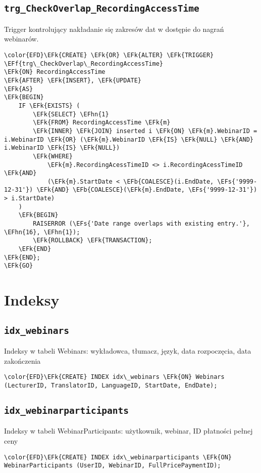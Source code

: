 \documentclass[11pt]{article}
\newcommand{\EFs}[1]{\textcolor{EFs}{#1}} %
\newcommand{\EFk}[1]{\textcolor{EFk}{\textbf{#1}}} %
\newcommand{\EFb}[1]{\textcolor{EFb}{\textbf{#1}}} %
\newcommand{\EFf}[1]{\textcolor{EFf}{#1}} %
\newcommand{\EFhn}[1]{\textcolor{EFhn}{#1}} %
\begin{document}
\subsection{\texttt{trg\_CheckOverlap\_RecordingAccessTime}}
\label{sec:org70a054b}
Trigger kontrolujący nakładanie się zakresów dat w dostępie do nagrań webinarów.
\begin{Code}
\begin{Verbatim}
\color{EFD}\EFk{CREATE} \EFk{OR} \EFk{ALTER} \EFk{TRIGGER} \EFf{trg\_CheckOverlap\_RecordingAccessTime}
\EFk{ON} RecordingAccessTime
\EFk{AFTER} \EFk{INSERT}, \EFk{UPDATE}
\EFk{AS}
\EFk{BEGIN}
    IF \EFk{EXISTS} (
        \EFk{SELECT} \EFhn{1} 
        \EFk{FROM} RecordingAccessTime \EFk{m}
        \EFk{INNER} \EFk{JOIN} inserted i \EFk{ON} \EFk{m}.WebinarID = i.WebinarID \EFk{OR} (\EFk{m}.WebinarID \EFk{IS} \EFk{NULL} \EFk{AND} i.WebinarID \EFk{IS} \EFk{NULL})
        \EFk{WHERE} 
            \EFk{m}.RecordingAcessTimeID <> i.RecordingAcessTimeID \EFk{AND}
            (\EFk{m}.StartDate < \EFb{COALESCE}(i.EndDate, \EFs{'9999-12-31'}) \EFk{AND} \EFb{COALESCE}(\EFk{m}.EndDate, \EFs{'9999-12-31'}) > i.StartDate)
    )
    \EFk{BEGIN}
        RAISERROR (\EFs{'Date range overlaps with existing entry.'}, \EFhn{16}, \EFhn{1});
        \EFk{ROLLBACK} \EFk{TRANSACTION};
    \EFk{END}
\EFk{END};
\EFk{GO}
\end{Verbatim}
\end{Code}
\section{Indeksy}
\label{sec:org4fc2bf6}
\subsection{\texttt{idx\_webinars}}
\label{sec:org6125f2c}
Indeksy w tabeli Webinars: wykładowca, tłumacz, język, data rozpoczęcia, data zakończenia
\begin{Code}
\begin{Verbatim}
\color{EFD}\EFk{CREATE} INDEX idx\_webinars \EFk{ON} Webinars (LecturerID, TranslatorID, LanguageID, StartDate, EndDate);
\end{Verbatim}
\end{Code}
\subsection{\texttt{idx\_webinarparticipants}}
\label{sec:orgd820a04}
Indeksy w tabeli WebinarParticipants: użytkownik, webinar, ID płatności pełnej ceny
\begin{Code}
\begin{Verbatim}
\color{EFD}\EFk{CREATE} INDEX idx\_webinarparticipants \EFk{ON} WebinarParticipants (UserID, WebinarID, FullPricePaymentID);
\end{Verbatim}
\end{Code}
\end{document}

